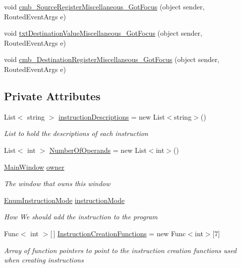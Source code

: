 \begin{DoxyCompactItemize}
\item 
void \hyperlink{class_c_p_u___o_s___simulator_1_1_instructions_window_aebeed4545e10bda489f1f73f4c09a20c}{cmb\+\_\+\+Source\+Register\+Miscellaneous\+\_\+\+Got\+Focus} (object sender, Routed\+Event\+Args e)
\item 
void \hyperlink{class_c_p_u___o_s___simulator_1_1_instructions_window_aceca94bcec64cbfd4cfe472e9dd34a58}{txt\+Destination\+Value\+Miscellaneous\+\_\+\+Got\+Focus} (object sender, Routed\+Event\+Args e)
\item 
void \hyperlink{class_c_p_u___o_s___simulator_1_1_instructions_window_aa05471f59f3884c72353dd2fd41fbabf}{cmb\+\_\+\+Destination\+Register\+Miscellaneous\+\_\+\+Got\+Focus} (object sender, Routed\+Event\+Args e)
\end{DoxyCompactItemize}
\subsection*{Private Attributes}
\begin{DoxyCompactItemize}
\item 
List$<$ string $>$ \hyperlink{class_c_p_u___o_s___simulator_1_1_instructions_window_a678ab4df2b78758142472eeed8c5d7ba}{instruction\+Descriptions} = new List$<$string$>$()
\begin{DoxyCompactList}\small\item\em List to hold the descriptions of each instruction \end{DoxyCompactList}\item 
List$<$ int $>$ \hyperlink{class_c_p_u___o_s___simulator_1_1_instructions_window_a6a10065d655000cc37a281b242fb7fb5}{Number\+Of\+Operands} = new List$<$int$>$()
\item 
\hyperlink{class_c_p_u___o_s___simulator_1_1_main_window}{Main\+Window} \hyperlink{class_c_p_u___o_s___simulator_1_1_instructions_window_a954c950c677c61a3b7ed7406b6dc7164}{owner}
\begin{DoxyCompactList}\small\item\em The window that owns this window \end{DoxyCompactList}\item 
\hyperlink{namespace_c_p_u___o_s___simulator_adc17a5a5e004084f05dc8e4d3f70e31f}{Enum\+Instruction\+Mode} \hyperlink{class_c_p_u___o_s___simulator_1_1_instructions_window_aae7addf8e362e26e981b36b9940a53c0}{instruction\+Mode}
\begin{DoxyCompactList}\small\item\em How We should add the instruction to the program \end{DoxyCompactList}\item 
Func$<$ int $>$\mbox{[}$\,$\mbox{]} \hyperlink{class_c_p_u___o_s___simulator_1_1_instructions_window_ae303b32cfc2f5e7cc5ab18df94fd574b}{Instruction\+Creation\+Functions} = new Func$<$int$>$\mbox{[}7\mbox{]}
\begin{DoxyCompactList}\small\item\em Array of function pointers to point to the instruction creation functions used when creating instructions \end{DoxyCompactList}\end{DoxyCompactItemize}


